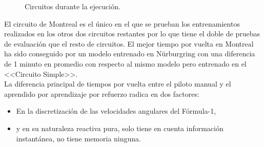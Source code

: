 \begin{figure}[ht!]
  \begin{center}
    \hspace{0.1cm}
    \hspace{0.1cm}
  \end{center}
  \centering
  \captionsetup{justification=centering,margin=2cm}
  \caption{Circuitos durante la ejecución.}
  \label{fig:circuitos-frame}
\end{figure}

El circuito de Montreal es el único en el que se prueban los entrenamientos realizados en los otros dos circuitos restantes por lo que tiene el doble de pruebas de evaluación que el resto de circuitos. El mejor tiempo por vuelta en Montreal ha sido conseguido por un modelo entrenado en Nürburgring con una diferencia de 1 minuto en promedio con respecto al mismo modelo pero entrenado en el <<Circuito Simple>>.\\

La diferencia principal de tiempos por vuelta entre el piloto manual y el aprendido por aprendizaje por refuerzo radica en dos factores:\\

\begin{itemize}
    \item En la discretización de las velocidades angulares del Fórmula-1,
    \item y en su naturaleza reactiva pura, solo tiene en cuenta información instantánea, no tiene memoria ninguna.\\
\end{itemize}

